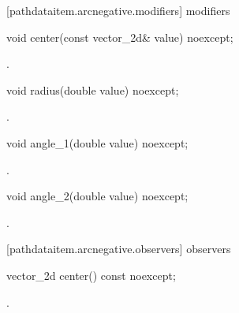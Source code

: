  [pathdataitem.arcnegative.modifiers]{ modifiers}

\begin{itemdecl}
    void center(const vector_2d& value) noexcept;
\end{itemdecl}
\begin{itemdescr}
	\pnum
	\postconditions
	.
	
\end{itemdescr}

\begin{itemdecl}
    void radius(double value) noexcept;
\end{itemdecl}
\begin{itemdescr}
	\pnum
	\postconditions
	.
	
\end{itemdescr}

\begin{itemdecl}
    void angle_1(double value) noexcept;
\end{itemdecl}
\begin{itemdescr}
	\pnum
	\postconditions
	.
	
\end{itemdescr}

\begin{itemdecl}
    void angle_2(double value) noexcept;
\end{itemdecl}
\begin{itemdescr}
	\pnum
	\postconditions
	.
	
\end{itemdescr}

 [pathdataitem.arcnegative.observers]{ observers}

\begin{itemdecl}
    vector_2d center() const noexcept;
\end{itemdecl}
\begin{itemdescr}
	\pnum
	\returns
	.

\end{itemdescr}

